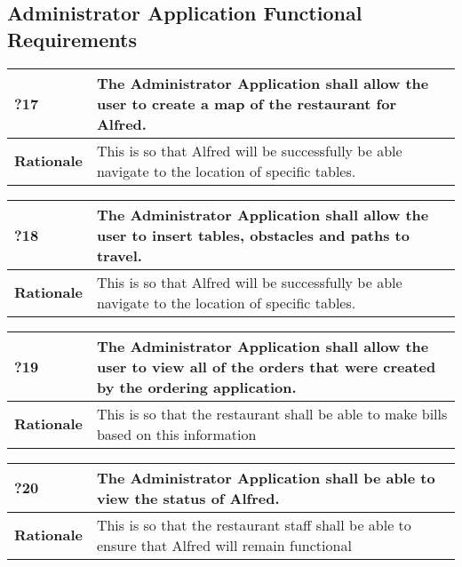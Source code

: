 \documentclass [11pt]{article}
\begin{document}
\subsection{Administrator Application Functional Requirements}

\begin{longtable}{| p{ } | p{ } | }\hline 
	\rowcolor{tableCell}\textbf{?17} & The Administrator Application shall allow the user to create a map of the restaurant for Alfred. \\ \hline
	\textbf{Rationale} &  This is so that Alfred will be successfully be able navigate to the location of specific tables.\\ \hline 
\end{longtable}

\begin{longtable}{| p{ } | p{ } | }\hline 
	\rowcolor{tableCell}\textbf{?18} & The Administrator Application shall allow the user to insert tables, obstacles and paths to travel. \\ \hline
	\textbf{Rationale} &  This is so that Alfred will be successfully be able navigate to the location of specific tables.\\ \hline 
\end{longtable}

\begin{longtable}{| p{ } | p{ } | }\hline 
	\rowcolor{tableCell}\textbf{?19} & The Administrator Application shall allow the user to view all of the orders that were created by the ordering application. \\ \hline
	\textbf{Rationale} &  This is so that the restaurant shall be able to make bills based on this information\\ \hline 
\end{longtable}

\begin{longtable}{| p{ } | p{ } | }\hline 
	\rowcolor{tableCell}\textbf{?20} & The Administrator Application shall be able to view the status of Alfred. \\ \hline
	\textbf{Rationale} &  This is so that the restaurant staff shall be able to ensure that Alfred will remain functional\\ \hline 
\end{longtable}



\end{document}
